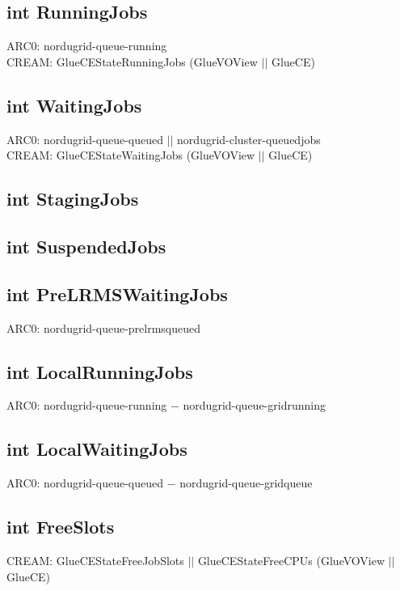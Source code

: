 \documentclass{book}
\begin{document}
\subsection*{int RunningJobs}

ARC0: nordugrid-queue-running \\
CREAM: GlueCEStateRunningJobs (GlueVOView $||$ GlueCE)

\subsection*{int WaitingJobs}

ARC0: nordugrid-queue-queued $||$ nordugrid-cluster-queuedjobs \\
CREAM: GlueCEStateWaitingJobs (GlueVOView $||$ GlueCE)

\subsection*{int StagingJobs}

\subsection*{int SuspendedJobs}

\subsection*{int PreLRMSWaitingJobs}

ARC0: nordugrid-queue-prelrmsqueued

\subsection*{int LocalRunningJobs}

ARC0: nordugrid-queue-running $-$ nordugrid-queue-gridrunning

\subsection*{int LocalWaitingJobs}

ARC0: nordugrid-queue-queued $-$ nordugrid-queue-gridqueue

\subsection*{int FreeSlots}

CREAM: GlueCEStateFreeJobSlots $||$ GlueCEStateFreeCPUs (GlueVOView $||$ GlueCE)
\end{document}
